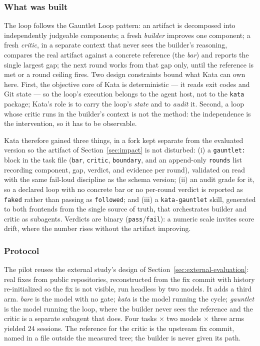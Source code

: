 \documentclass[11pt]{article}
\begin{document}
\subsubsection{What was built}

The loop follows the Gauntlet Loop pattern: an artifact is decomposed into
independently judgeable components; a fresh \emph{builder} improves one
component; a fresh \emph{critic}, in a separate context that never sees the
builder's reasoning, compares the real artifact against a concrete reference
(the \emph{bar}) and reports the single largest gap; the next round works from
that gap only, until the reference is met or a round ceiling fires. Two design
constraints bound what Kata can own here. First, the objective core of Kata is
deterministic --- it reads exit codes and Git state --- so the loop's execution
belongs to the agent host, not to the \texttt{kata} package; Kata's role is to
carry the loop's \emph{state} and to \emph{audit} it. Second, a loop whose
critic runs in the builder's context is not the method: the independence is the
intervention, so it has to be observable.

Kata therefore gained three things, in a fork kept separate from the evaluated
version so the artifact of Section~\ref{sec:impact} is not disturbed:
(i) a \texttt{gauntlet:} block in the task file
(\texttt{bar}, \texttt{critic}, \texttt{boundary}, and an append-only
\texttt{rounds} list recording component, gap, verdict, and evidence per round),
validated on read with the same fail-loud discipline as the schema version;
(ii) an audit grade for it, so a declared loop with no concrete bar or no
per-round verdict is reported as \texttt{faked} rather than passing as
\texttt{followed}; and (iii) a \texttt{kata-gauntlet} skill, generated to both
frontends from the single source of truth, that orchestrates builder and critic
as subagents. Verdicts are binary (\texttt{pass}/\texttt{fail}): a numeric
scale invites score drift, where the number rises without the artifact
improving.

\subsubsection{Protocol}

The pilot reuses the external study's design of
Section~\ref{sec:external-evaluation}: real fixes from public repositories,
reconstructed from the fix commit with history re-initialized so the fix is not
visible, run headless by two models. It adds a third arm. \emph{bare} is the
model with no gate; \emph{kata} is the model running the cycle; \emph{gauntlet}
is the model running the loop, where the builder never sees the reference and
the critic is a separate subagent that does. Four tasks $\times$ two models
$\times$ three arms yielded 24 sessions. The reference for the critic is the
upstream fix commit, named in a file outside the measured tree; the builder is
never given its path.
\end{document}
